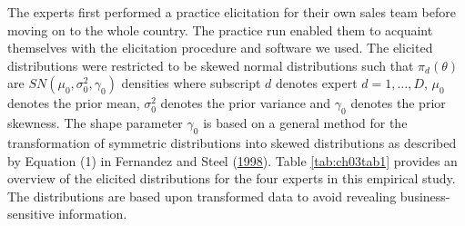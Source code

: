 \documentclass[openright,titlepage,12pt,a4paper]{book}
\begin{document}
The experts first performed a practice elicitation for their own sales team before moving on to the whole country. The practice run enabled them to acquaint themselves with the elicitation procedure and software we used. The elicited distributions were restricted to be skewed normal distributions such that \(\pi_d(\theta)\) are \(SN(\mu_0,\sigma^2_0,\gamma_0)\) densities where subscript \(d\) denotes expert \(d = 1,...,D\), \(\mu_0\) denotes the prior mean, \(\sigma^2_0\) denotes the prior variance and \(\gamma_0\) denotes the prior skewness. The shape parameter \(\gamma_0\) is based on a general method for the transformation of symmetric distributions into skewed distributions as described by Equation (1) in Fernandez and Steel (\protect\hyperlink{ref-fernandez_bayesian_1998}{1998}). Table \ref{tab:ch03tab1} provides an overview of the elicited distributions for the four experts in this empirical study. The distributions are based upon transformed data to avoid revealing business-sensitive information.
\end{document}
